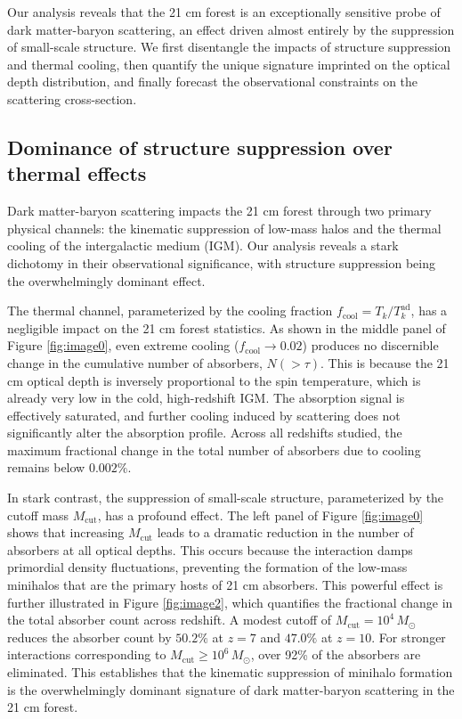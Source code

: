 \documentclass[]{article}
\begin{document}
Our analysis reveals that the 21 cm forest is an exceptionally sensitive probe of dark matter-baryon scattering, an effect driven almost entirely by the suppression of small-scale structure. We first disentangle the impacts of structure suppression and thermal cooling, then quantify the unique signature imprinted on the optical depth distribution, and finally forecast the observational constraints on the scattering cross-section.

\subsection{Dominance of structure suppression over thermal effects}

Dark matter-baryon scattering impacts the 21 cm forest through two primary physical channels: the kinematic suppression of low-mass halos and the thermal cooling of the intergalactic medium (IGM). Our analysis reveals a stark dichotomy in their observational significance, with structure suppression being the overwhelmingly dominant effect.

The thermal channel, parameterized by the cooling fraction $f_{\text{cool}} = T_k / T_k^{\text{ad}}$, has a negligible impact on the 21 cm forest statistics. As shown in the middle panel of Figure \ref{fig:image0}, even extreme cooling ($f_{\text{cool}} \to 0.02$) produces no discernible change in the cumulative number of absorbers, $N(>\tau)$. This is because the 21 cm optical depth is inversely proportional to the spin temperature, which is already very low in the cold, high-redshift IGM. The absorption signal is effectively saturated, and further cooling induced by scattering does not significantly alter the absorption profile. Across all redshifts studied, the maximum fractional change in the total number of absorbers due to cooling remains below $0.002\%$.

In stark contrast, the suppression of small-scale structure, parameterized by the cutoff mass $M_{\text{cut}}$, has a profound effect. The left panel of Figure \ref{fig:image0} shows that increasing $M_{\text{cut}}$ leads to a dramatic reduction in the number of absorbers at all optical depths. This occurs because the interaction damps primordial density fluctuations, preventing the formation of the low-mass minihalos that are the primary hosts of 21 cm absorbers. This powerful effect is further illustrated in Figure \ref{fig:image2}, which quantifies the fractional change in the total absorber count across redshift. A modest cutoff of $M_{\text{cut}} = 10^4 \, M_\odot$ reduces the absorber count by $50.2\%$ at $z=7$ and $47.0\%$ at $z=10$. For stronger interactions corresponding to $M_{\text{cut}} \ge 10^6 \, M_\odot$, over 92\% of the absorbers are eliminated. This establishes that the kinematic suppression of minihalo formation is the overwhelmingly dominant signature of dark matter-baryon scattering in the 21 cm forest.
\end{document}
